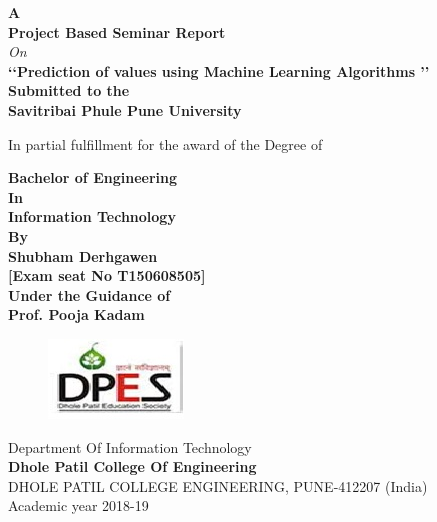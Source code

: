 \documentclass[12pt,times,a4paper]{report}
\begin{document}
\begin{titlepage}
\newpage

\pagestyle{empty}

\thispagestyle{empty}
\thisfancypage{%
  \setlength{\fboxrule}{2pt}\doublebox}{}

\begin{center}
\vspace*{0.2in}
{\fontsize{18}{16} \bf {A}}\\
{\fontsize{18}{16} \bf {Project Based Seminar Report}}\\
{\fontsize{18}{16} \it {On }}\\
\vspace*{0.2in}
{\fontsize{18}{14} \bf {\lq\lq  Prediction of values using Machine Learning Algorithms \rq\rq}}\\
\vspace*{0.2in}
{\fontsize{12}{16} \bf  Submitted to the}\\
{\fontsize{12}{16} \bf Savitribai Phule Pune University
}
\begin{normalsize}
\begin{center}
In partial fulfillment for the award of the Degree of
\end{center}
\end{normalsize}

{\fontsize{14}{12} \bf  Bachelor of Engineering }\\
{\fontsize{14}{12} \bf  In}
\\{\fontsize{14}{12} \bf  Information Technology }\\
{\fontsize{12}{16} \bf   By}\\
\vspace*{0.1in}
{\fontsize{14}{12} \bf Shubham Derhgawen }\\
{\fontsize{12}{8} \bf [Exam seat No T150608505] }\\

\vspace*{0.2in}
{\fontsize{12}{16} \bf Under the Guidance of }\\
\vspace*{0.1in}
{\fontsize{14}{12} \bf Prof. Pooja Kadam}\\
\begin{figure}[h]
\centerline{\includegraphics[scale=0.8]{logo1.jpg}}
\end{figure}

{ \fontsize{14}{12}  {Department Of Information Technology}}\\
{ \fontsize{14}{12} \bf {Dhole Patil  College Of Engineering}}\\
{ \fontsize{14}{12}  {DHOLE PATIL COLLEGE ENGINEERING, PUNE-412207 (India)}}\\

Academic year 2018-19

\end{center}
\end{titlepage}
\end{document}
